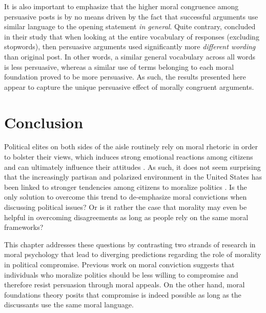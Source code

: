 It is also important to emphasize that the higher moral congruence among persuasive posts is by no means driven by the fact that successful arguments use similar language to the opening statement \textit{in general}. Quite contrary, \citet[618]{tan2016winning} concluded in their study that when looking at the entire vocabulary of responses (excluding stopwords),  then persuasive arguments used significantly more \textit{different wording} than original post. In other words, a similar general vocabulary across all words is less persuasive, whereas a similar use of terms belonging to each moral foundation proved to be more persuasive. As such, the results presented here appear to capture the unique persuasive effect of morally congruent arguments.




\section{Conclusion}\label{conclusion}

Political elites on both sides of the aisle routinely rely on moral rhetoric in order to bolster their views, which induces strong emotional reactions among citizens \citep{lipsitz2017playing} and can ultimately influence their attitudes \citep[e.g.,][]{clifford2013words,clifford2015concerns}. As such, it does not seem surprising that the increasingly partisan and polarized environment in the United States has been linked to stronger tendencies among citizens to moralize politics \citep{garrett2018moral}. Is the only solution to overcome this trend to de-emphasize moral convictions when discussing political issues? Or is it rather the case that morality may even be helpful in overcoming disagreements as long as people rely on the same moral frameworks?

This chapter addresses these questions by contrasting two strands of research in moral psychology that lead to diverging predictions regarding the role of morality in political compromise. Previous work on moral conviction suggests that individuals who moralize politics should be less willing to compromise and therefore resist persuasion through moral appeals. On the other hand, moral foundations theory posits that compromise is indeed possible as long as the discussants use the same moral language.

